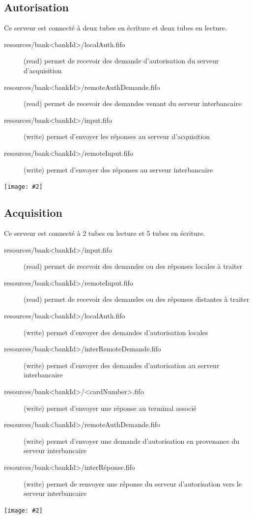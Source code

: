 \documentclass[french, a4paper, 12pt, titlepage]{article}
\newcommand{\graph}[2]{
\medskip
	\begin{center}
		\texttt{[image: \#2]}
	\end{center}
\medskip
}
\begin{document}
\subsection{Autorisation}
Ce serveur est connecté à deux tubes en écriture et deux tubes en lecture.
\begin{description}
	\item[resources/bank<bankId>/localAuth.fifo] (read) permet de recevoir des demande d'autorisation du serveur d'acquisition
	\item[resources/bank<bankId>/remoteAuthDemande.fifo] (read) permet de recevoir des demandes venant du serveur interbancaire
	\item[resources/bank<bankId>/input.fifo] (write) permet d'envoyer les réponses au serveur d'acquisition
	\item[resources/bank<bankId>/remoteInput.fifo] (write) permet d'envoyer des réponses au serveur interbancaire
\end{description}
\graph{0.5}{autorisation}
\subsection{Acquisition}
Ce serveur est connecté à 2 tubes en lecture et 5 tubes en écriture.
\begin{description}
	\item[resources/bank<bankId>/input.fifo] (read) permet de recevoir des demandes ou des réponses locales à traiter
	\item[resources/bank<bankId>/remoteInput.fifo] (read) permet de recevoir des demandes ou des réponses distantes à traiter
	\item[resources/bank<bankId>/localAuth.fifo] (write) permet d'envoyer des demandes d'autorisation locales
	\item[resources/bank<bankId>/interRemoteDemande.fifo] (write) permet d'envoyer des demandes d'autorisation au serveur interbancaire
	\item[resources/bank<bankId>/<cardNumber>.fifo] (write) permet d'envoyer une réponse au terminal associé
	\item[resources/bank<bankId>/remoteAuthDemande.fifo] (write) permet d'envoyer une demande d'autorisation en provenance du serveur interbancaire
	\item[resources/bank<bankId>/interRéponse.fifo] (write) permet de renvoyer une réponse du serveur d'autorisation vers le serveur interbancaire
\end{description}
\graph{0.5}{acquisition}
\end{document}
